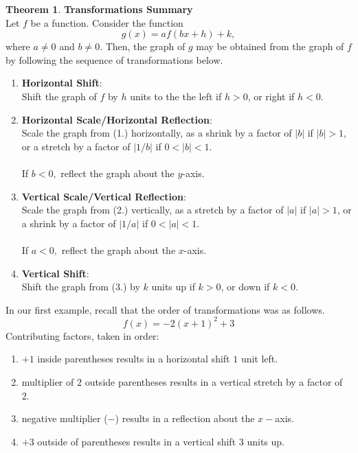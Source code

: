 \documentclass[11pt]{book}
\theoremstyle{definition}  %
\newtheorem{thm}{Theorem}[chapter] %
\newcommand{\bbm}{\begin{boxedminipage}{4.80in}} %
\newcommand{\ebm}{\end{boxedminipage}}
\begin{document}

\bbm

\smallskip

\begin{thm} \label{transformationsthm}\textbf{Transformations Summary}\\
Let $f$ be a function.  Consider the function 
$$g(x)=af(bx+h)+k,$$
where $a \neq 0$ and $b \neq 0$.  Then, the graph of $g$ may be obtained from the graph of $f$ by following the sequence of transformations below. 
\begin{enumerate}
\item  \textbf{Horizontal Shift}:\\
Shift the graph of $f$ by $h$ units to the the left if $h > 0$, or right if $h< 0$.
\item  \textbf{Horizontal Scale/Horizontal Reflection}:\\
Scale the graph from (1.) horizontally, as a shrink by a factor of $|b|$ if $|b|>1$, or a stretch by a factor of $|1/b|$ if $0<|b|<1$.\\
~\\
If $b<0,$ reflect the graph about the $y$-axis.
\item  \textbf{Vertical Scale/Vertical Reflection}:\\
Scale the graph from (2.) vertically, as a stretch by a factor of $|a|$ if $|a|>1$, or a shrink by a factor of $|1/a|$ if $0<|a|<1$.\\
~\\
If $a<0,$ reflect the graph about the $x$-axis.
\item  \textbf{Vertical Shift}:\\
Shift the graph from (3.) by $k$ units up if $k > 0$, or down if $k< 0$.
\end{enumerate}
\end{thm}

\ebm

\smallskip
\newpage
In our first example, recall that the order of transformations was as follows.
$$f(x)=-2(x+1)^2+3$$
Contributing factors, taken in order:
\begin{enumerate}
	\item $+1$ inside parentheses results in a horizontal shift $1$ unit left.
	\item multiplier of $2$ outside parentheses results in a vertical stretch by a factor of 2.
	\item negative multiplier ($-$) results in a reflection about the $x-$axis.
	\item $+3$ outside of parentheses results in a vertical shift $3$ units up.
\end{enumerate}
\end{document}
